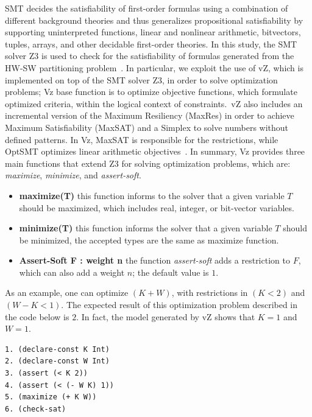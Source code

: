 SMT decides the satisfiability of first-order formulas using a combination of different background theories and thus generalizes propositional satisfiability by supporting uninterpreted functions, linear and nonlinear arithmetic, bitvectors, tuples, arrays, and other decidable first-order theories. In this study, the SMT solver Z3 is used to check for the satisfiability of formulas generated from the HW-SW partitioning problem~\cite{Bjorner2014}. In particular, we exploit the use of vZ, which is implemented on top of the SMT solver Z3, in order to solve optimization problems; Vz base function is to optimize objective functions, which formulate optimized criteria, within the logical context of constraints.~vZ also includes an incremental version of the Maximum Resiliency (MaxRes) \cite{Federica2008} in order to achieve Maximum Satisfiability (MaxSAT) \cite{NarodytskaN} and a Simplex to solve numbers without defined patterns. In Vz, MaxSAT is responsible for the restrictions, while OptSMT optimizes linear arithmetic objectives~\cite{Bjorner2015}. In summary, Vz provides three main functions that extend Z3 for solving optimization problems, which are: \textit{maximize}, \textit{minimize}, and \textit{assert-soft}.

\begin{itemize}
\item{\textbf{maximize(T)}
this function informs to the solver that a given variable $T$ should be maximized, which includes real, integer, or bit-vector variables.}
\item{\textbf{minimize(T)}
this function informs the solver that a given variable $T$ should be minimized, the accepted types are the same as maximize function.}
\item{\textbf{Assert-Soft F : weight n}
the function \textit{assert-soft} adds a restriction to $F$, which can also add a weight $n$; the default value is $1$.}
\end{itemize}

As an example, one can optimize $\left(K + W\right)$, with restrictions in $\left(K < 2\right)$ and $\left(W - K < 1\right)$. The expected result of this optimization problem described in the code below is $2$. In fact, the model generated by vZ shows that $K = 1$ and $W = 1$.

\begin{lstlisting}[caption=Example of SMT formula using vZ, label=vZ]
1. (declare-const K Int) 
2. (declare-const W Int)
3. (assert (< K 2)) 
4. (assert (< (- W K) 1))
5. (maximize (+ K W)) 
6. (check-sat)
\end{lstlisting}

